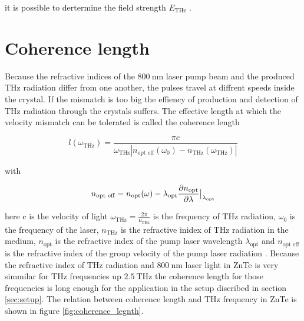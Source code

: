 it is possible to dertermine the field strength $E_\text{THz}$ \cite[7]{THZ_eltric_field}.


\section{Coherence length}
Because the refractive indices of the $\SI{800}{\nano\meter}$ laser pump beam and the produced $\si{\tera\hertz}$ radiation differ from one another, the pulses travel at diffrent speeds inside the crystal.
If the mismatch is too big the effiency of production and detection of $\si{\tera\hertz}$ radiation through the crystals suffers.
The effective length at which the velocity mismatch can be tolerated is called the coherence length

\begin{equation}
    l(\omega_{\si{\tera\hertz}}) = \frac{\pi c}{\omega_{\si{\tera\hertz}} \left | n_\text{opt eff}(\omega_0) - n_{\si{\tera\hertz}}(\omega_{\si{\tera\hertz}})\right |}
\end{equation}

with 

\begin{equation}
    n_{\text{opt eff}} = n_\text{opt}(\omega) - \lambda_\text{opt}\frac{\partial n_\text{opt}}{\partial \lambda}\big{|}_{\lambda_\text{opt}}   
\end{equation}

here c is the velocity of light $\omega_{\si{\tera\hertz}} = \frac{2\pi}{\nu_{\si{\tera\hertz}}}$ is the frequency of $\si{\tera\hertz}$ radiation, $\omega_0$ is the frequency of the laser, $n_{\si{\tera\hertz}}$ is the refractive inidex of $\si{\tera\hertz}$ radiation in the medium, $n_\text{opt}$ is the refractive index of the pump laser wavelength $\lambda_\text{opt}$ and $n_\text{opt eff}$ is the refractive index of the group velocity of the pump laser radiation \cite[3]{coherence_legnth}.
Because the refractive index of $\si{\tera\hertz}$ radiation and $\SI{800}{\nano\meter}$ laser light in ZnTe is very simmilar for $\si{\tera\hertz}$ frequencies up $\SI{2.5}{\tera\hertz}$ \cite{coherence_legnth} the coherence length for those frequencies is long enough for the application in the setup discribed in section \ref{sec:setup}.
The relation between coherence length and $\si{\tera\hertz}$ frequency in ZnTe is shown in figure \ref{fig:coherence_legnth}.

